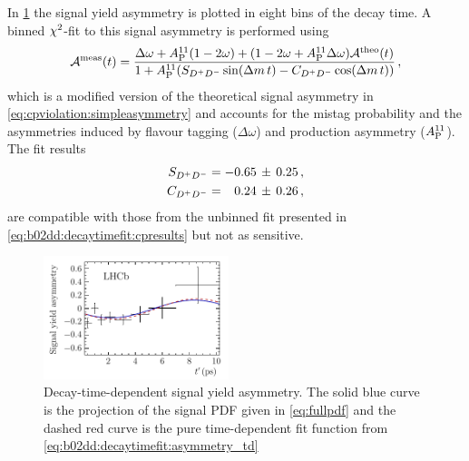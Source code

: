 In \cref{fig:b02dd:decaytimefit:asymmetry} the signal yield asymmetry is
plotted in eight bins of the decay time. A binned $\chi^2$-fit to this signal
asymmetry is performed using
\begin{align}
{\mathcal A}^{\text{meas}}(t) = \frac{\Delta\omega + A_\text{P}^{11}(1 - 2\omega) + (1 - 2\omega + A_\text{P}^{11}\Delta\omega){\mathcal A}^{\text{theo}}(t)}{1 + A_\text{P}^{11}(S_{{{D}^+}{{D}^-}} \sin({\Delta m}\,t) - C_{{{D}^+}{{D}^-}} \cos({\Delta m}\,t))}\,,
\label{eq:b02dd:decaytimefit:asymmetry_td}
\end{align}
which is a modified version of the theoretical signal asymmetry in
\cref{eq:cpviolation:simpleasymmetry} and accounts for the mistag probability
\mistag and the asymmetries induced by flavour tagging ($\Delta\omega$) and
production asymmetry ($A_\text{P}^{11}$). The fit results
\begin{align*}
\begin{split}
  S_{{{D}^+}{{D}^-}}                &= -0.65\,\pm\,0.25 \,, \\
  C_{{{D}^+}{{D}^-}}                &= \phantom{-}0.24\,\pm\,0.26 \,,
\end{split}
\end{align*}
are compatible with those from the unbinned fit presented in
\cref{eq:b02dd:decaytimefit:cpresults} but not as sensitive.
\begin{figure}[htb]
\centering
\includegraphics[width=0.48\textwidth]{07-B02DD/tikz/pdf/Asymmetry.pdf}
\caption{Decay-time-dependent signal yield asymmetry. The solid blue curve is the
projection of the signal PDF given in \cref{eq:fullpdf} and the dashed red curve is the
pure time-dependent fit function from
\cref{eq:b02dd:decaytimefit:asymmetry_td}}
\label{fig:b02dd:decaytimefit:asymmetry}
\end{figure}

\FloatBarrier
